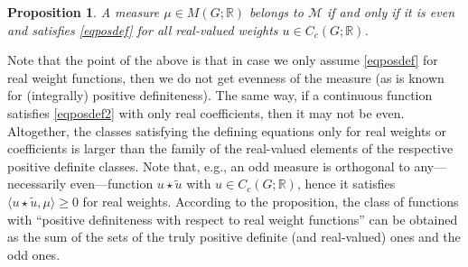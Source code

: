\documentclass[[a4paper,english,12pt]{amsart}
\theoremstyle{plain}
\newtheorem{proposition}[theorem]{Proposition}
\theoremstyle{remark}
\newcommand{\magenta}[1]{{\color{magenta}{#1}}}
\newcommand{\MM}{\mathcal{M}}
\newcommand{\RR}{\mathbb R}
\begin{document}
\begin{proposition} A measure $\mu \in M(G;\RR)$  belongs to $\MM$ if and only if it is even and satisfies \eqref{eqposdef} for all \emph{real-valued} weights $u \in C_c(G;\RR)$. 
\end{proposition}

Note that the point of the above is that in case we only assume \eqref{eqposdef} for  real weight functions, then we do not get evenness of the measure (as is known for (integrally) positive definiteness). The same way, if a continuous function satisfies \eqref{eqposdef2} with only real coefficients, then it may not be even. Altogether, the classes satisfying the defining equations only for real weights or coefficients is larger than the family of the real-valued elements of the respective positive definite classes. Note that, e.g., an odd measure is orthogonal to any---necessarily even---function $u \star \widetilde{u}$ with $u \in C_c(G;\RR)$, hence it satisfies $\langle u\star \widetilde{u},\mu\rangle\ge 0$ for real weights. According to the proposition, the class of functions with ``positive definiteness with respect to real weight functions'' can be obtained as the sum of the sets of the truly positive definite (and real-valued) ones and the odd ones.
\end{document}
